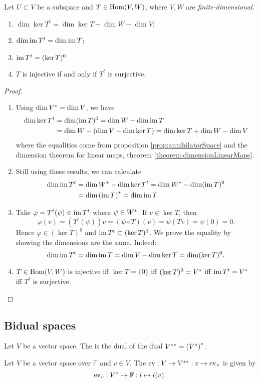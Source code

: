 \begin{proposition}
Let $U\subset V$ be a subspace and $T\in \operatorname{Hom}(V,W)$, where $V,W$ are \emph{finite-dimensional}.
\begin{enumerate}
\item $\dim\ker T^t = \dim \ker T + \dim W - \dim V$;
\item $\dim\operatorname{im} T^t = \dim \operatorname{im} T$;
\item $\operatorname{im} T^t = (\ker T)^0$
\item $T$ is injective \textup{if and only if} $T^t$ is surjective.
\end{enumerate}
\end{proposition}
\begin{proof}
\mbox{}
\begin{enumerate}
\item Using $\dim {V}^* = \dim V$, we have
\begin{align*}
\dim \ker T^t &= \dim(\operatorname{im} T)^0 = \dim W-\dim \operatorname{im} T \\
&= \dim W - (\dim V - \dim \ker T) = \dim \ker T + \dim W - \dim V
\end{align*}
where the equalities come from proposition \ref{prop:annihilatorSpace} and the dimension theorem for linear maps, theorem \ref{theorem:dimensionLinearMaps}.
\item Still using these results, we can calculate
\begin{align*}
\dim \operatorname{im} T^t &= \dim {W}^* - \dim \ker T^t = \dim {W}^* - \dim (\operatorname{im} T)^0 \\
&= \dim {(\operatorname{im}T)}^* = \dim \operatorname{im} T.
\end{align*}
\item Take $\varphi = T^t(\psi) \in \operatorname{im} T^t$ where $\psi \in {W}^*$. If $v\in \ker T$, then
\[ \varphi(v) = \left(T^t(\psi)\right)v = (\psi\circ T)(v) = \psi(Tv) = \psi(0) = 0. \]
Hence $\varphi \in (\ker T)^0$ and $\operatorname{im} T^t\subset (\ker T)^0$. We prove the equality by showing the dimensions are the same. Indeed:
\[ \dim \operatorname{im} T^t = \dim \operatorname{im} T = \dim V - \dim \ker T = \dim(\ker T)^0. \]
\item $T\in\operatorname{Hom}(V,W)$ is injective iff $\ker T = \{0\}$ iff $(\ker T)^0 = {V}^*$ iff $\operatorname{im} T^t = {V}^*$ iff $T^t$ is surjective.
\end{enumerate}
\end{proof}
\subsection{Bidual spaces}
\begin{definition}
Let $V$ be a vector space. The  is the dual of the dual ${V}^{**} = {({V}^*)}^*$.
\end{definition}
\begin{definition}
Let $V$ be a vector space over $\mathbb{F}$ and $v\in V$. The  $\operatorname{ev}: V\to {V}^{**}: v\mapsto \operatorname{ev}_v$ is given by
\[ \operatorname{ev}_v: {V}^* \to \mathbb{F}: l\mapsto l(v). \]
\end{definition}

